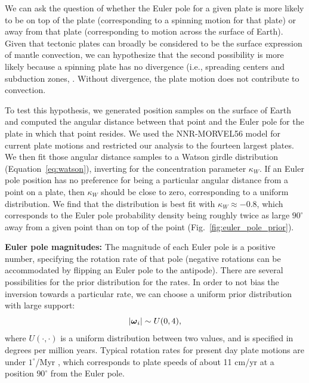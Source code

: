 \documentclass[11pt,letterpaper]{article}
\newcommand{\mitbf}[1]{\hbox{\mathversion{bold}$#1$}}
\begin{document}
We can ask the question of whether the Euler pole for a given plate is more likely to be on top of the plate (corresponding to a spinning motion for that plate) or away from that plate (corresponding to motion across the surface of Earth). Given that tectonic plates can broadly be considered to be the surface expression of mantle convection, we can hypothesize that the second possibility is more likely because a spinning plate has no divergence (i.e., spreading centers and subduction zones, \citep{Forte1987a, Gable1991a}. Without divergence, the plate motion does not contribute to convection.

To test this hypothesis, we generated position samples on the surface of Earth and computed the angular distance between that point and the Euler pole for the plate in which that point resides. We used the NNR-MORVEL56 model for current plate motions \citep{Argus2011a} and restricted our analysis to the fourteen largest plates. We then fit those angular distance samples to a Watson girdle distribution (Equation~\eqref{eq:watson}),  inverting for the concentration parameter $\kappa_W$. If an Euler pole position has no preference for being a particular angular distance from a point on a plate, then $\kappa_W$ should be close to zero, corresponding to a uniform distribution. We find that the distribution is best fit with $\kappa_W \approx -0.8$, which corresponds to the Euler pole probability density being roughly twice as large $90^\circ$ away from a given point than on top of the point (Fig.~\ref{fig:euler_pole_prior}).

\textbf{Euler pole magnitudes:} 
The magnitude of each Euler pole is a positive number, specifying the rotation rate of that pole (negative rotations can be accommodated by flipping an Euler pole to the antipode). There are several possibilities for the prior distribution for the rates. In order to not bias the inversion towards a particular rate, we can choose a uniform prior distribution with large support:
\begin{equation}
\vert \mitbf{\omega}_i \vert \sim U(0, 4),
\end{equation}
where $U(\cdot, \cdot)$ is a uniform distribution between two values, and is specified  in degrees per million years. Typical rotation rates for present day plate motions are under $1^\circ$/Myr \citep{Argus2011a}, which corresponds to plate speeds of about 11 cm/yr at a position $90^\circ$ from the Euler pole.
\end{document}

